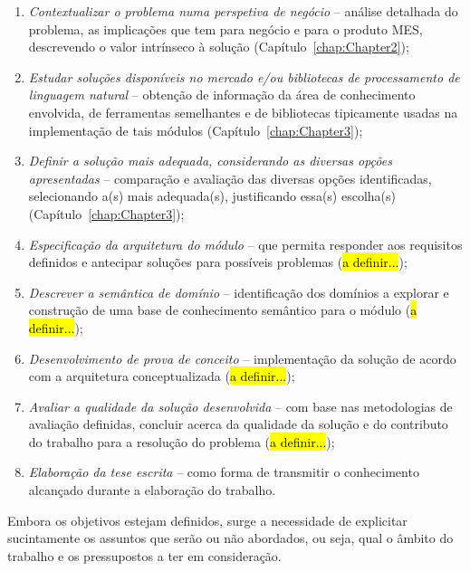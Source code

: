 \begin{enumerate}
    \item
    \label{enum:ch1_objectives_1}
    {
        \textit{Contextualizar o problema numa perspetiva de negócio} -- análise detalhada do problema, as implicações que tem para negócio e para o produto \gls{MES}, descrevendo o valor intrínseco à solução (Capítulo~\ref{chap:Chapter2});
    }
    \item
    \label{enum:ch1_objectives_2}
    {
        \textit{Estudar soluções disponíveis no mercado e/ou bibliotecas de processamento de linguagem natural} -- obtenção de informação da área de conhecimento envolvida, de ferramentas semelhantes e de bibliotecas tipicamente usadas na implementação de tais módulos (Capítulo~\ref{chap:Chapter3});
    }
    \item
    \label{enum:ch1_objectives_3}
    {
        \textit{Definir a solução mais adequada, considerando as diversas opções apresentadas} -- comparação e avaliação das diversas opções identificadas, selecionando a(s) mais adequada(s), justificando essa(s) escolha(s) (Capítulo~\ref{chap:Chapter3});
    }
    \item
    \label{enum:ch1_objectives_4}
    {
        \textit{Especificação da arquitetura do módulo} -- que permita responder aos requisitos definidos e antecipar soluções para possíveis problemas (\hl{a definir...});
    }
    \item
    \label{enum:ch1_objectives_5}
    {
        \textit{Descrever a semântica de domínio} -- identificação dos domínios a explorar e construção de uma base de conhecimento semântico para o módulo (\hl{a definir...});
    }
    \item
    \label{enum:ch1_objectives_6}
    {
        \textit{Desenvolvimento de prova de conceito} -- implementação da solução de acordo com a arquitetura conceptualizada (\hl{a definir...});
    }
    \item
    \label{enum:ch1_objectives_7}
    {
        \textit{Avaliar a qualidade da solução desenvolvida} -- com base nas metodologias de avaliação definidas, concluir acerca da qualidade da solução e do contributo do trabalho para a resolução do problema (\hl{a definir...});
    }
    \item
    \label{enum:ch1_objectives_8}
    {
        \textit{Elaboração da tese escrita} -- como forma de transmitir o conhecimento alcançado durante a elaboração do trabalho.
    }
\end{enumerate}

Embora os objetivos estejam definidos, surge a necessidade de explicitar sucintamente os assuntos que serão ou não abordados, ou seja, qual o âmbito do trabalho e os pressupostos a ter em consideração.

